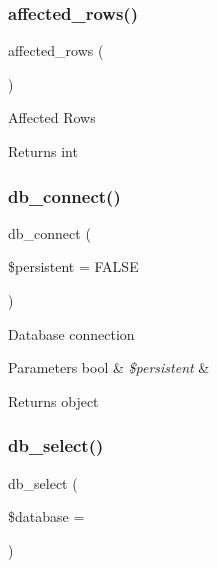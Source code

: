 \subsubsection{\texorpdfstring{affected\+\_\+rows()}{affected\_rows()}}
{\footnotesize\ttfamily affected\+\_\+rows (\begin{DoxyParamCaption}{ }\end{DoxyParamCaption})}

Affected Rows

\begin{DoxyReturn}{Returns}
int 
\end{DoxyReturn}
\mbox{\label{class_c_i___d_b__mysqli__driver_a52bf595e79e96cc0a7c907a9b45aeb4d}} 
\subsubsection{\texorpdfstring{db\+\_\+connect()}{db\_connect()}}
{\footnotesize\ttfamily db\+\_\+connect (\begin{DoxyParamCaption}\item[{}]{\$persistent = {\ttfamily FALSE} }\end{DoxyParamCaption})}

Database connection


\begin{DoxyParams}[1]{Parameters}
bool & {\em \$persistent} & \\
\hline
\end{DoxyParams}
\begin{DoxyReturn}{Returns}
object 
\end{DoxyReturn}
\mbox{\label{class_c_i___d_b__mysqli__driver_a18ae9c21870b30b45337c5e3626190cc}} 
\subsubsection{\texorpdfstring{db\+\_\+select()}{db\_select()}}
{\footnotesize\ttfamily db\+\_\+select (\begin{DoxyParamCaption}\item[{}]{\$database = {\ttfamily \textquotesingle{}\textquotesingle{}} }\end{DoxyParamCaption})}

